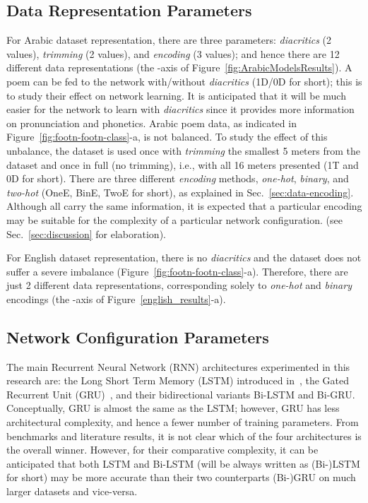 \documentclass[journal,10pt,twocolumns,letter]{IEEEtran}
\begin{document}
\subsection{Data Representation Parameters}\label{sec:param-data-repr-1}
For Arabic dataset representation, there are three parameters: \textit{diacritics} (2 values),
\textit{trimming} (2 values), and \textit{encoding} (3 values); and hence there are 12 different
data representations (the -axis of Figure~\ref{fig:ArabicModelsResults}). A poem can be fed to the
network with/without \textit{diacritics} (1D/0D for short); this is to study their effect on
network learning. It is anticipated that it will be much easier for the network to learn with
\textit{diacritics} since it provides more information on pronunciation and phonetics. Arabic poem
data, as indicated in Figure~\ref{fig:footn-footn-class}-a, is not balanced. To study the effect of
this unbalance, the dataset is used once with \textit{trimming} the smallest 5 meters from the
dataset and once in full (no trimming), i.e., with all 16 meters presented (1T and 0D for
short). There are three different \textit{encoding} methods, \textit{one-hot}, \textit{binary}, and
\textit{two-hot} (OneE, BinE, TwoE for short), as explained in
Sec.~\ref{sec:data-encoding}. Although all carry the same information, it is expected that a
particular encoding may be suitable for the complexity of a particular network configuration. (see
Sec.~\ref{sec:discussion} for elaboration).

For English dataset representation, there is no \textit{diacritics} and the dataset does not suffer
a severe imbalance (Figure~\ref{fig:footn-footn-class}-a). Therefore, there are just 2 different
data representations, corresponding solely to \textit{one-hot} and \textit{binary} encodings (the
-axis of Figure~\ref{english_results}-a).


\subsection{Network Configuration Parameters}\label{sec:param-netw-conf}
The main Recurrent Neural Network (RNN) architectures experimented in this research are: the Long
Short Term Memory (LSTM) introduced in~\cite{Hochreiter1997LongShortTermMemory}, the Gated Recurrent
Unit (GRU)~\citep{Cho2014LearningPhraseRepresentationsUsing}, and their bidirectional variants
Bi-LSTM and Bi-GRU\@. Conceptually, GRU is almost the same as the LSTM; however, GRU has less
architectural complexity, and hence a fewer number of training parameters. From benchmarks and
literature results, it is not clear which of the four architectures is the overall winner. However,
for their comparative complexity, it can be anticipated that both LSTM and Bi-LSTM (will be always
written as (Bi-)LSTM for short) may be more accurate than their two counterparts (Bi-)GRU on much
larger datasets and vice-versa.
\end{document}
